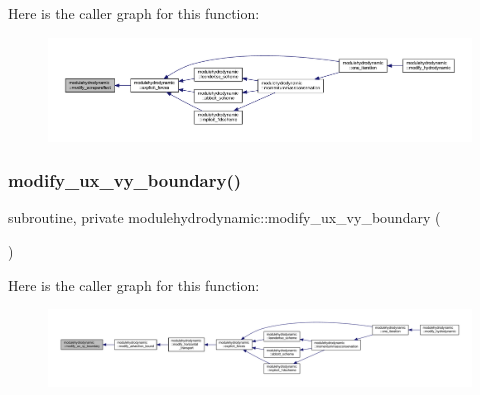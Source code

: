 Here is the caller graph for this function\+:\nopagebreak
\begin{figure}[H]
\begin{center}
\leavevmode
\includegraphics[width=350pt]{namespacemodulehydrodynamic_a9f02295d5c7e337e76ec98febfebdc0b_icgraph}
\end{center}
\end{figure}
\mbox{\label{namespacemodulehydrodynamic_aa6b040cc956589c18c71f8802c0239ed}} 
\subsubsection{\texorpdfstring{modify\+\_\+ux\+\_\+vy\+\_\+boundary()}{modify\_ux\_vy\_boundary()}}
{\footnotesize\ttfamily subroutine, private modulehydrodynamic\+::modify\+\_\+ux\+\_\+vy\+\_\+boundary (\begin{DoxyParamCaption}{ }\end{DoxyParamCaption})\hspace{0.3cm}{\ttfamily [private]}}

Here is the caller graph for this function\+:\nopagebreak
\begin{figure}[H]
\begin{center}
\leavevmode
\includegraphics[width=350pt]{namespacemodulehydrodynamic_aa6b040cc956589c18c71f8802c0239ed_icgraph}
\end{center}
\end{figure}
\mbox{\label{namespacemodulehydrodynamic_a6396fb9a63198209bc95000bda6ab5fc}} 

